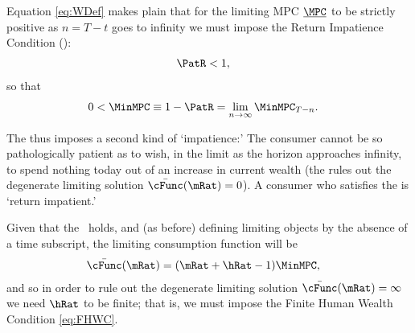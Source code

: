 \documentclass[BufferStockTheory]{subfiles}
\begin{document}
Equation \eqref{eq:WDef} makes plain that for the limiting MPC $\underbar{\MPC}$ to be strictly positive as $n=T-t$ goes to infinity we must impose the Return Impatience Condition (\RIC):
\begin{align}
  \PatR  & < 1   \label{eq:RIC},
\end{align}
so that
\begin{align}
  0 <  \MinMPC  & \equiv   1-\PatR = \lim_{n \rightarrow \infty} \MinMPC_{T-n} \label{eq:MinMPCDef}
                  .
\end{align}

The {\RIC} thus imposes a second kind of `impatience:' The consumer cannot be so pathologically patient as to wish, in the limit as the horizon approaches infinity, to spend nothing today out of an increase in current wealth (the {\RIC} rules out the degenerate limiting solution $\bar{\cFunc}(\mRat)=0$).  A consumer who satisfies the {\RIC} is `return impatient.'

Given that the {\RIC}~holds, and (as before) defining limiting objects by the absence of a time subscript, the limiting consumption function will be
\begin{align}\label{eq:cFuncPFUnc}
  \bar{\cFunc}(\mRat)  & = (\mRat+\hRat-1)\MinMPC, 
\end{align}
and so in order to rule out the degenerate limiting
solution $\bar{\cFunc}(\mRat) = \infty$ we need $\hRat$ to be finite; that is, we
must impose the Finite Human Wealth Condition \eqref{eq:FHWC}.

\hypertarget{ValuePFAnalytical}{}
\hypertarget{Autarky-Value-PF}{}
\end{document}
